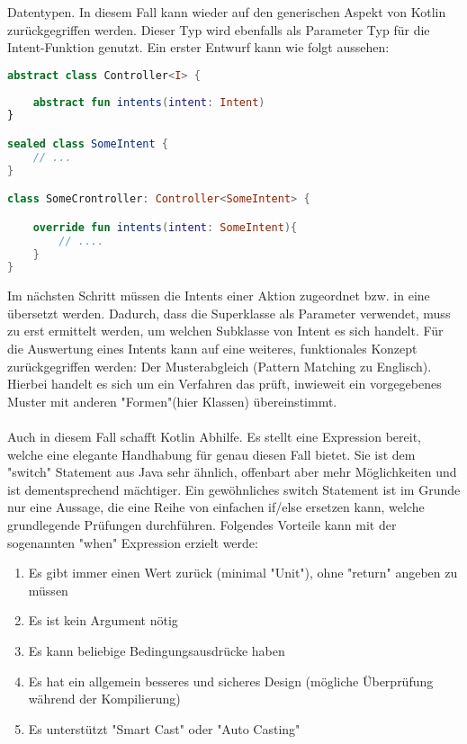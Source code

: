 Datentypen. In diesem Fall kann wieder auf den generischen Aspekt von Kotlin zurückgegriffen werden. 
Dieser Typ wird ebenfalls als Parameter Typ für die Intent-Funktion genutzt. Ein erster Entwurf kann wie 
folgt aussehen:
\\
\begin{lstlisting}[caption={Erster Controller Entwurf}, label={}, language=Kotlin]
abstract class Controller<I> {
	
	abstract fun intents(intent: Intent)
}

sealed class SomeIntent {
	// ...
}

class SomeCrontroller: Controller<SomeIntent> {

	override fun intents(intent: SomeIntent){
		// ....
	}
}
\end{lstlisting}
\bigskip
Im nächsten Schritt müssen die Intents einer Aktion zugeordnet bzw. in eine übersetzt werden. Dadurch, 
dass die Superklasse als Parameter verwendet, muss zu erst ermittelt werden, um welchen Subklasse von 
Intent es sich handelt. Für die Auswertung eines Intents kann auf eine weiteres, funktionales Konzept 
zurückgegriffen werden: Der Musterabgleich (Pattern Matching zu Englisch). Hierbei handelt es sich um ein 
Verfahren das prüft, inwieweit ein vorgegebenes Muster mit anderen "Formen"(hier Klassen) übereinstimmt. 
\\
\\
Auch in diesem Fall schafft Kotlin Abhilfe. Es stellt eine Expression bereit, welche eine elegante 
Handhabung für genau diesen Fall bietet. Sie ist dem "switch" Statement aus Java sehr ähnlich, offenbart 
aber mehr Möglichkeiten und ist dementsprechend mächtiger. Ein gewöhnliches switch Statement ist im 
Grunde nur eine Aussage, die eine Reihe von einfachen if/else ersetzen kann, welche grundlegende Prüfungen durchführen. Folgendes Vorteile kann mit der sogenannten "when" Expression erzielt werde:
\begin{enumerate}
	\item Es gibt immer einen Wert zurück (minimal "Unit"), ohne "return" angeben zu müssen
	\item Es ist kein Argument nötig
	\item Es kann beliebige Bedingungsausdrücke haben
	\item \label{when-design} Es hat ein allgemein besseres und sicheres Design (mögliche Überprüfung während der Kompilierung)
	\item \label{when-smart-cast} Es unterstützt "Smart Cast" oder "Auto Casting"
\end{enumerate}
